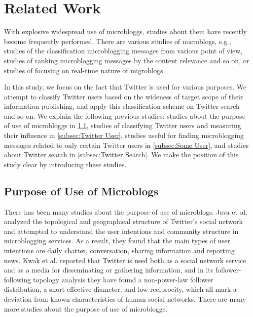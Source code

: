 \section{Related Work}
\label{sec:Related Work}

With explosive widespread use of microbloggs, studies about
them have recently become frequently performed.  There are various
studies of microblogs, e.g., studies of the
classification microblogging messages from various point of
view\cite{irani2010study}, studies of ranking microblogging messages by
the content relevance and so on\cite{duan2010empirical}, or studies of focusing on
real-time nature of migroblogs\cite{takemura2012tweet,mathioudakis2010twittermonitor}.

In this study, we focus on the fact that Twitter is used for various
purposes. We attempt to classify Twitter users based on the
wideness of target scope of their information publishing, and apply this
classification scheme on Twitter search and so on.  We explain the
following previous studies: studies about the purpose of use of
microbloggs in \ref{subsec:Purpose of Use}, studies of
classifying Twitter users and measuring their influence in
\ref{subsec:Twitter User}, studies useful for finding microblogging
messages related to only certain Twitter users in \ref{subsec:Some
User}, and studies about Twitter search in \ref{subsec:Twitter Search}.
We make the position of this study clear by introducing these studies.

\subsection{Purpose of Use of Microblogs}
\label{subsec:Purpose of Use}

There has been many studies about the purpose of use of microblogs. Java
et al.\cite{java2007we} analyzed the topological and
geographical structure of Twitter's social network and attempted to
understand the user intentions and community structure in microblogging
services.  As a result, they found that the main types of user
intentions are daily chatter, conversation, sharing information and
reporting news.  Kwak et al.\cite{kwak2010twitter} reported that Twitter
is used both as a social network service and as a media for
disseminating or gathering information, and in its follower-following
topology analysis they have found a non-power-law follower distribution,
a short effective diameter, and low reciprocity, which all mark a
deviation from known characteristics of human social networks.  There
are many more studies about the purpose of use of microbloggs\cite{wu2011says,zhao2009and}.

